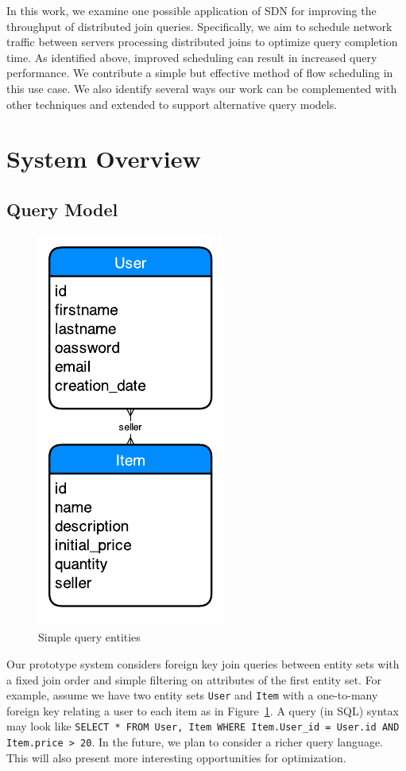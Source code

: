 \documentclass{sig-alternate-2013}
\begin{document}
In this work, we examine one possible application of SDN for improving the throughput of distributed join queries.
Specifically, we aim to schedule network traffic between servers processing distributed joins to optimize query completion time.
As identified above, improved scheduling can result in increased query performance.
We contribute a simple but effective method of flow scheduling in this use case.
We also identify several ways our work can be complemented with other techniques and extended to support alternative query models.

\section{System Overview}

\subsection{Query Model}

\begin{figure}
    \centering
    \includegraphics{figures/rubis-er.pdf}
    \caption{Simple query entities}\label{fig:entities}
\end{figure}

Our prototype system considers foreign key join queries between entity sets with a fixed join order and simple filtering on attributes of the first entity set.
For example, assume we have two entity sets \texttt{User} and \texttt{Item} with a one-to-many foreign key relating a user to each item as in Figure~\ref{fig:entities}.
A query (in SQL) syntax may look like \texttt{SELECT * FROM User, Item WHERE Item.User\_id = User.id AND Item.price > 20}.
In the future, we plan to consider a richer query language.
This will also present more interesting opportunities for optimization.
\end{document}
